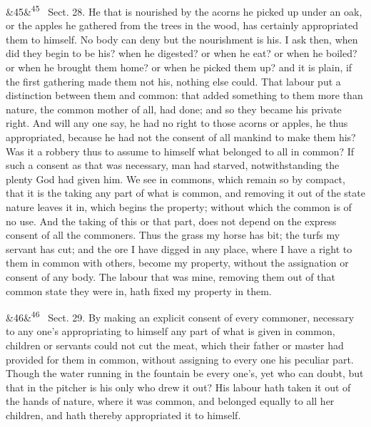 \documentclass[12pt]{article}
\newcommand{\para}[1][]{\par\noindent\ifx&#1&\else\textsuperscript{\footnotesize #1}~\fi}
\begin{document}
\para[45] Sect. 28. He that is nourished by the acorns he picked up under an oak, or the apples he gathered from the trees in the wood, has certainly appropriated them to himself. No body can deny but the nourishment is his. I ask then, when did they begin to be his? when he digested? or when he eat? or when he boiled? or when he brought them home? or when he picked them up? and it is plain, if the first gathering made them not his, nothing else could. That labour put a distinction between them and common: that added something to them more than nature, the common mother of all, had done; and so they became his private right. And will any one say, he had no right to those acorns or apples, he thus appropriated, because he had not the consent of all mankind to make them his? Was it a robbery thus to assume to himself what belonged to all in common? If such a consent as that was necessary, man had starved, notwithstanding the plenty God had given him. We see in commons, which remain so by compact, that it is the taking any part of what is common, and removing it out of the state nature leaves it in, which begins the property; without which the common is of no use. And the taking of this or that part, does not depend on the express consent of all the commoners. Thus the grass my horse has bit; the turfs my servant has cut; and the ore I have digged in any place, where I have a right to them in common with others, become my property, without the assignation or consent of any body. The labour that was mine, removing them out of that common state they were in, hath fixed my property in them.

\para[46] Sect. 29. By making an explicit consent of every commoner, necessary to any one's appropriating to himself any part of what is given in common, children or servants could not cut the meat, which their father or master had provided for them in common, without assigning to every one his peculiar part. Though the water running in the fountain be every one's, yet who can doubt, but that in the pitcher is his only who drew it out? His labour hath taken it out of the hands of nature, where it was common, and belonged equally to all her children, and hath thereby appropriated it to himself.
\end{document}

